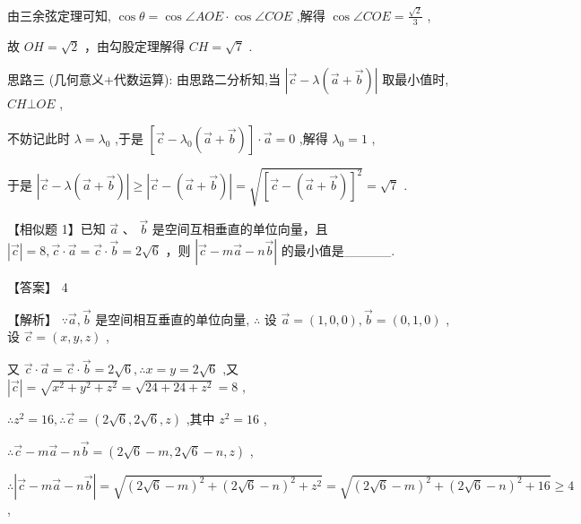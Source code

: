 \documentclass[10pt]{article}
\begin{document}
由三余弦定理可知, \(\cos \theta  = \cos \angle {AOE} \cdot  \cos \angle {COE}\) ,解得 \(\cos \angle {COE} = \frac{\sqrt{2}}{3}\) ,

故 \({OH} = \sqrt{2}\) ，由勾股定理解得 \({CH} = \sqrt{7}\) .

思路三 (几何意义+代数运算): 由思路二分析知,当 \(\left| {\overrightarrow{c} - \lambda \left( {\overrightarrow{a} + \overrightarrow{b}}\right) }\right|\) 取最小值时, \({CH} \bot  {OE}\) ,

不妨记此时 \(\lambda  = {\lambda }_{0}\) ,于是 \(\left\lbrack  {\overrightarrow{c} - {\lambda }_{0}\left( {\overrightarrow{a} + \overrightarrow{b}}\right) }\right\rbrack   \cdot  \overrightarrow{a} = 0\) ,解得 \({\lambda }_{0} = 1\) ,

于是 \(\left| {\overrightarrow{c} - \lambda \left( {\overrightarrow{a} + \overrightarrow{b}}\right) }\right|  \geq  \left| {\overrightarrow{c} - \left( {\overrightarrow{a} + \overrightarrow{b}}\right) }\right|  = \sqrt{{\left\lbrack  \overrightarrow{c} - \left( \overrightarrow{a} + \overrightarrow{b}\right) \right\rbrack  }^{2}} = \sqrt{7}\) .

【相似题 1】已知 \(\overrightarrow{a}\text{ 、 }\overrightarrow{b}\) 是空间互相垂直的单位向量，且 \(\left| \overrightarrow{c}\right|  = 8,\overrightarrow{c} \cdot  \overrightarrow{a} = \overrightarrow{c} \cdot  \overrightarrow{b} = 2\sqrt{6}\) ，则 \(\left| {\overrightarrow{c} - m\overrightarrow{a} - n\overrightarrow{b}}\right|\) 的最小值是\_\_\_\_\_.

【答案】 4

【解析】 \(\because \overrightarrow{a},\overrightarrow{b}\) 是空间相互垂直的单位向量, \(\therefore\) 设 \(\overrightarrow{a} = \left( {1,0,0}\right) ,\overrightarrow{b} = \left( {0,1,0}\right)\) ,设 \(\overrightarrow{c} = \left( {x,y,z}\right)\) ,

又 \(\overrightarrow{c} \cdot  \overrightarrow{a} = \overrightarrow{c} \cdot  \overrightarrow{b} = 2\sqrt{6},\therefore x = y = 2\sqrt{6}\) ,又 \(\left| \overrightarrow{c}\right|  = \sqrt{{x}^{2} + {y}^{2} + {z}^{2}} = \sqrt{{24} + {24} + {z}^{2}} = 8\) ,

\(\therefore {z}^{2} = {16},\therefore \overrightarrow{c} = \left( {2\sqrt{6},2\sqrt{6},z}\right)\) ,其中 \({z}^{2} = {16}\) ,

\(\therefore \overrightarrow{c} - m\overrightarrow{a} - n\overrightarrow{b} = \left( {2\sqrt{6} - m,2\sqrt{6} - n,z}\right)\) ,

\(\therefore \left| {\overrightarrow{c} - m\overrightarrow{a} - n\overrightarrow{b}}\right|  = \sqrt{{\left( 2\sqrt{6} - m\right) }^{2} + {\left( 2\sqrt{6} - n\right) }^{2} + {z}^{2}} = \sqrt{{\left( 2\sqrt{6} - m\right) }^{2} + {\left( 2\sqrt{6} - n\right) }^{2} + {16}} \geq  4\) ,
\end{document}
